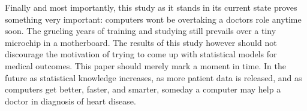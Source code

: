 \documentclass[12pt]{article}
\begin{document}
Finally and most importantly, this study as it stands in its current state proves something very important: computers won\textsc{}t be overtaking a doctor\textsc{}s role anytime soon. The grueling years of training and studying still prevails over a tiny microchip in a motherboard. The results of this study however should not discourage the motivation of trying to come up with statistical models for medical outcomes. This paper should merely mark a moment in time. In the future as statistical knowledge increases, as more patient data is released, and as computers get better, faster, and smarter, someday a computer may help a doctor in diagnosis of heart disease.

\newpage


\end{document}
